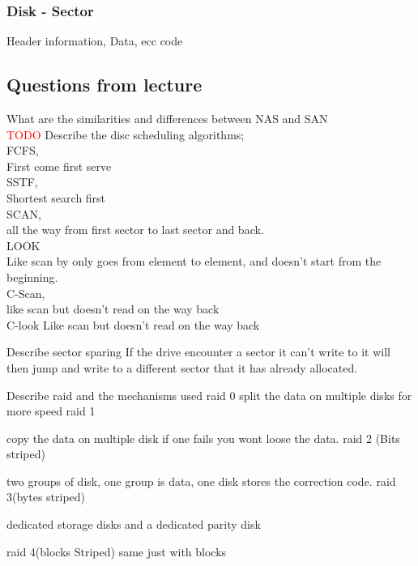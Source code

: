 \documentclass[a4paper,10pt,titlepage]{report}
\begin{document}
\subsubsection{Disk - Sector}
Header information, Data, ecc code \\






\subsection{Questions from lecture}
	What are the similarities and differences between NAS and SAN \\
		\textcolor{red}{TODO}
	Describe the disc scheduling algorithms; \\
		FCFS, \\
		First come first serve\\
		
		SSTF, \\
		Shortest search first \\
			
		SCAN, \\
		all the way from first sector to last sector and back.\\
		
		LOOK \\
		Like scan by only goes from element to element, and doesn't start from the beginning. \\	
	
		C-Scan, \\
		like scan but doesn't read on the way back \\
		
		
		C-look		
		Like scan  but doesn't read on the way back
		
	Describe sector sparing
		If the drive encounter a sector it can't write to it will then jump and write to a different sector that it has already allocated.
	
	Describe raid and the mechanisms used
	raid 0
		split the data on multiple disks for more speed
	raid 1
	
		copy the data on multiple disk if one fails you wont loose the data.
	raid 2 (Bits striped)
	
	two groups of disk, one group is data, one disk stores the correction code.
	raid 3(bytes striped)
	
		dedicated storage disks and a dedicated parity disk
		
	raid 4(blocks Striped)
	same just with blocks
	
\end{document}
